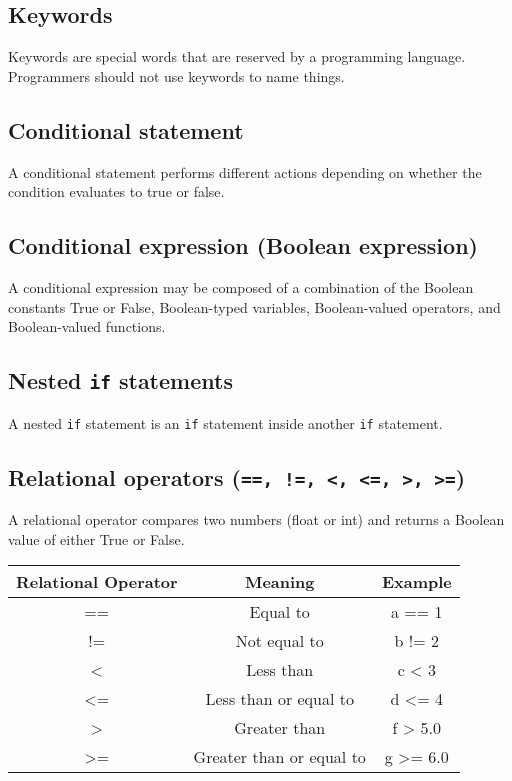 \documentclass[11pt]{article}
\begin{document}
\subsection{Keywords}
\label{sec:org82af545}
Keywords are special words that are reserved by a programming language. Programmers should not use keywords to name things.
\subsection{Conditional statement}
\label{sec:org3016dfa}
A conditional statement performs different actions depending on whether the condition evaluates to true or false.
\subsection{Conditional expression (Boolean expression)}
\label{sec:org41814b6}
A conditional expression may be composed of a combination of the Boolean constants True or False, Boolean-typed variables, Boolean-valued operators, and Boolean-valued functions.
\subsection{Nested \texttt{if} statements}
\label{sec:org772f0e0}
A nested \texttt{if} statement is an \texttt{if} statement inside another \texttt{if} statement.
\subsection{Relational operators (\texttt{==, !=, <, <=, >, >=})}
\label{sec:org52a78ca}
A relational operator compares two numbers (float or int) and returns a Boolean value of either True or False.

\begin{center}
\begin{tabular}{c|c|c}
Relational Operator & Meaning & Example\\
\hline
== & Equal to & a == 1\\
!= & Not equal to & b != 2\\
< & Less than & c < 3\\
<= & Less than or equal to & d <= 4\\
> & Greater than & f > 5.0\\
>= & Greater than or equal to & g >= 6.0\\
\end{tabular}
\end{center}
\end{document}
